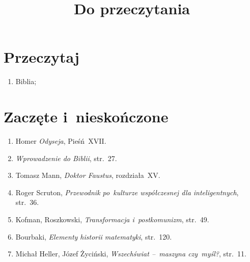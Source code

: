 \documentclass[a4paper,11pt]{article}
\title{Do przeczytania}
\begin{document}



\maketitle  %



\section{Przeczytaj}

\vspace{\spaceTwo}



\begin{enumerate}
\item Biblia;
\end{enumerate}






\newpage
\section{Zaczęte i~nieskończone}

\vspace{\spaceTwo}


\begin{enumerate}
\item Homer \emph{Odyseja}, Pieśń~XVII.
\item \emph{Wprowadzenie do Biblii}, str.~27.
\item Tomasz Mann, \emph{Doktor Faustus}, rozdziała~XV.
\item Roger Scruton, \emph{Przewodnik po~kulturze współczesnej dla
    inteligentnych}, str.~36.
\item Kofman, Roszkowski, \emph{Transformacja i~postkomunizm},
  str.~49.
\item Bourbaki, \emph{Elementy historii matematyki}, str.~120.
\item Michał Heller, Józef Życiński, \emph{Wszechświat --~maszyna
    czy~myśl?}, str.~11.
\end{enumerate}
\end{document}
